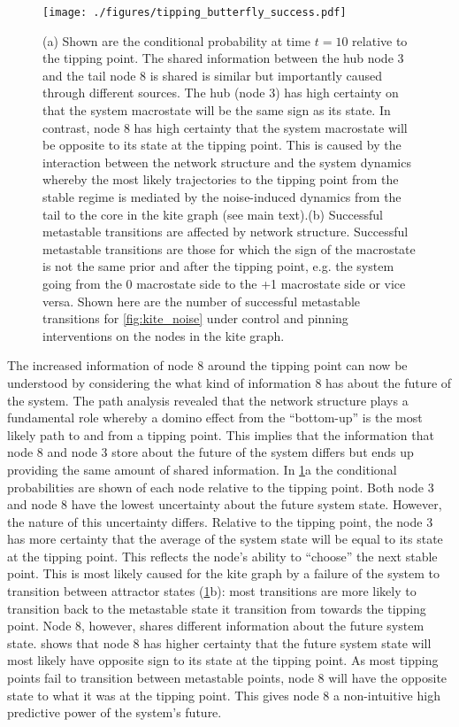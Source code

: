 \documentclass[a4paper, 11pt, twocolumn]{article}
\begin{document}
\begin{figure}
\centering
\texttt{[image: ./figures/tipping\_butterfly\_success.pdf]}
\caption{\label{fig:butterfly}(a) Shown are the conditional probability at time \(t=10\) relative to the tipping point. The shared information between the hub node 3 and the tail node 8 is shared is similar but importantly caused through different sources. The hub (node 3) has high certainty on that the system macrostate will be the same sign as its state. In contrast, node 8 has high certainty that the system macrostate will be opposite to its state at the tipping point. This is caused by the interaction between the network structure and the system dynamics whereby the most likely trajectories to the tipping point from the stable regime is mediated by the noise-induced dynamics from the tail to the core in the kite graph (see main text).(b) Successful metastable transitions are affected by network structure. Successful metastable transitions are those for which the sign of the macrostate is not the same prior and after the tipping point, e.g. the system going from the 0 macrostate side to the +1 macrostate side or vice versa. Shown here are the number of successful metastable transitions for \cref{fig:kite_noise} under control and pinning interventions on the nodes in the kite graph.}
\end{figure}

The increased information of node 8 around the tipping point
can  now  be understood  by  considering  the what  kind  of
information 8 has  about the future of the  system. The path
analysis  revealed  that  the   network  structure  plays  a
fundamental   role  whereby   a  domino   effect  from   the
``bottom-up'' is  the most likely  path to and from  a tipping
point. This  implies that  the information  that node  8 and
node 3 store about the future of the system differs but ends
up  providing  the same  amount  of  shared information.  In
\cref{fig:butterfly}{a}  the  conditional probabilities  are
shown of each node relative  to the tipping point. Both node
3 and  node 8 have  the lowest uncertainty about  the future
system  state.  However,  the  nature  of  this  uncertainty
differs. Relative to the tipping  point, the node 3 has more
certainty that the average of the system state will be equal
to its state at the  tipping point. This reflects the node's
ability  to ``choose''  the next  stable point.  This is  most
likely caused for the kite graph  by a failure of the system
to       transition      between       attractor      states
(\cref{fig:butterfly}{b}): most transitions  are more likely
to  transition back  to the  metastable state  it transition
from  towards the  tipping  point. Node  8, however,  shares
different  information   about  the  future   system  state.
 shows that node  8 has higher certainty
that the future system state  will most likely have opposite
sign  to its  state at  the tipping  point. As  most tipping
points fail to transition  between metastable points, node 8
will have the  opposite state to what it was  at the tipping
point.  This gives  node 8  a non-intuitive  high predictive
power of the system's future.
\end{document}
